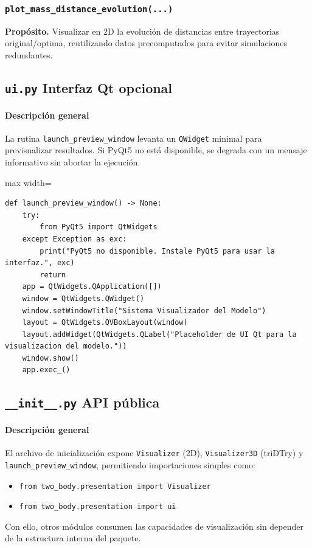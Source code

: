 \subsubsection*{\texttt{plot\_mass\_distance\_evolution(...)}}
\textbf{Propósito.} Visualizar en 2D la evolución de distancias entre trayectorias original/optima, reutilizando datos precomputados para evitar simulaciones redundantes.

\subsection{\texttt{ui.py} \- Interfaz Qt opcional}
\paragraph{Descripción general}
La rutina \texttt{launch\_preview\_window} levanta un \texttt{QWidget} minimal para previsualizar resultados. Si PyQt5 no está disponible, se degrada con un mensaje informativo sin abortar la ejecución.

\begin{listing}[H]
\caption{Lanzador de la ventana Qt}
\begin{adjustbox}{max width=\textwidth}
\begin{minipage}{\textwidth}
\begin{verbatim}
def launch_preview_window() -> None:
    try:
        from PyQt5 import QtWidgets
    except Exception as exc:
        print("PyQt5 no disponible. Instale PyQt5 para usar la interfaz.", exc)
        return
    app = QtWidgets.QApplication([])
    window = QtWidgets.QWidget()
    window.setWindowTitle("Sistema Visualizador del Modelo")
    layout = QtWidgets.QVBoxLayout(window)
    layout.addWidget(QtWidgets.QLabel("Placeholder de UI Qt para la visualizacion del modelo."))
    window.show()
    app.exec_()
\end{verbatim}
\end{minipage}
\end{adjustbox}
\end{listing}

\subsection{\texttt{\_\_init\_\_.py} \- API pública}
\paragraph{Descripción general}
El archivo de inicialización expone \texttt{Visualizer} (2D), \texttt{Visualizer3D} (triDTry) y \texttt{launch\_preview\_window}, permitiendo importaciones simples como:
\begin{itemize}
    \item \texttt{from two\_body.presentation import Visualizer}
    \item \texttt{from two\_body.presentation import ui}
\end{itemize}
Con ello, otros módulos consumen las capacidades de visualización sin depender de la estructura interna del paquete.
